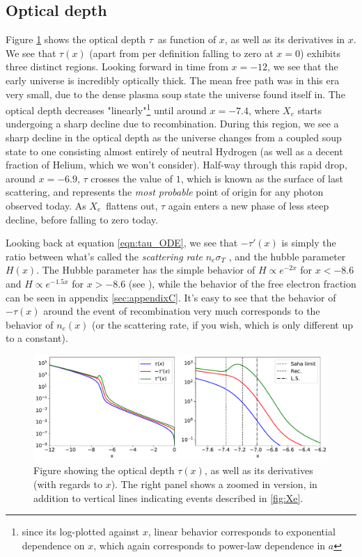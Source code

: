 \documentclass[10pt, a4paper]{article}
\renewcommand{\exp}{e^}
\renewcommand{\exp}{e^}
\begin{document}
\subsection{Optical depth}
Figure \ref{fig:tau} shows the optical depth $\tau$ as function of $x$, as well as its derivatives in $x$. We see that $\tau(x)$ (apart from per definition falling to zero at $x=0$) exhibits three distinct regions. Looking forward in time from $x=-12$, we see that the early universe is incredibly optically thick. The mean free path was in this era very small, due to the dense plasma soup state the universe found itself in. The optical depth decreases "linearly"\footnote{since its log-plotted against $x$, linear behavior corresponds to exponential dependence on $x$, which again corresponds to power-law dependence in $a$} until around $x=-7.4$, where $X_e$ starts undergoing a sharp decline due to recombination. During this region, we see a sharp decline in the optical depth as the universe changes from a coupled soup state to one consisting almost entirely of neutral Hydrogen (as well as a decent fraction of Helium, which we won't consider). Half-way through this rapid drop, around $x=-6.9$, $\tau$ crosses the value of $1$, which is known as the surface of last scattering, and represents the \textit{most probable} point of origin for any photon observed today. As $X_e$ flattens out, $\tau$ again enters a new phase of less steep decline, before falling to zero today.

Looking back at equation \ref{eqn:tau_ODE}, we see that $-\tau'(x)$ is simply the ratio between what's called the \textit{scattering rate} $n_e\sigma_T$ \cite[p. 72]{ModernCosmology2003}, and the hubble parameter $H(x)$. The Hubble parameter has the simple behavior of $H\propto \exp{-2x}$ for $x<-8.6$ and $H\propto \exp{-1.5x}$ for $x>-8.6$ (see \cite{Milestone1}), while the behavior of the free electron fraction can be seen in appendix \ref{sec:appendixC}. It's easy to see that the behavior of $-\tau(x)$ around the event of recombination very much corresponds to the behavior of $n_e(x)$ (or the scattering rate, if you wish, which is only different up to a constant).



\begin{figure}[H]
    \centering
    \includegraphics[scale=0.5]{../m2_figs/tau.pdf}
    \caption{Figure showing the optical depth $\tau(x)$, as well as its derivatives (with regards to $x$). The right panel shows a zoomed in version, in addition to vertical lines indicating events described in \ref{fig:Xe}.}
    \label{fig:tau}
\end{figure}
\end{document}
